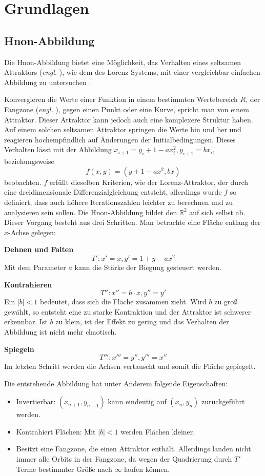 
\chapter{Grundlagen}
\label{ch:Grundlagen}
\section{H\e non-Abbildung}
Die H\e non-Abbildung bietet eine Möglichkeit, das Verhalten eines seltsamen Attraktors (\textit{engl. }), wie dem des Lorenz Systems, mit einer vergleichbar einfachen Abbildung zu untersuchen \cite{henon1976}.

Konvergieren die Werte einer Funktion in einem bestimmten Wertebereich $R$, der Fangzone (\textit{engl. }), gegen einen Punkt oder eine Kurve, spricht man von einem Attraktor. Dieser Attraktor kann jedoch auch eine komplexere Struktur haben. Auf einem solchen seltsamen Attraktor springen die Werte hin und her und reagieren hochempfindlich auf Änderungen der Initialbedingungen. Dieses Verhalten lässt mit der Abbildung $x_{i+1}=y_i + 1- a x_i^2, y_{i+1} = bx_i$, beziehungsweise 
$$f(x,y) = (y + 1- a x^2,bx)$$
beobachten. $f$ erfüllt dieselben Kriterien, wie der Lorenz-Attraktor, der durch eine dreidimensionale Differenzialgleichung entsteht, allerdings wurde $f$ so definiert, dass auch höhere Iterationszahlen leichter zu berechnen und zu analysieren sein sollen. Die H\e non-Abbildung bildet den $\mathbb{R}^2$ auf sich selbst ab. Dieser Vorgang besteht aus drei Schritten. Man betrachte eine Fläche entlang der $x$-Achse gelegen:

\textbf{Dehnen und Falten}
$$T': x'=x, y'= 1+ y - ax^2$$
Mit dem Parameter $a$ kann die Stärke der Biegung gesteuert werden.


\textbf{Kontrahieren}
$$T'': x''= b\cdot x, y''= y'$$
Ein $|b|<1$ bedeutet, dass sich die Fläche zusammen zieht. Wird $b$ zu groß gewählt, so entsteht eine zu starke Kontraktion und der Attraktor ist schwerer erkennbar. Ist $b$ zu klein, ist der Effekt zu gering und das Verhalten der Abbildung ist nicht mehr chaotisch.


\textbf{Spiegeln}
$$T''': x'''= y'', y'''= x''$$
Im letzten Schritt werden die Achsen vertauscht und somit die Fläche gepiegelt.


Die entstehende Abbildung hat unter Anderem folgende Eigenschaften:
\begin{itemize}
 \item Invertierbar: $(x_{n+1}, y_{n+1})$ kann eindeutig auf $(x_n, y_n)$ zurückgeführt werden.
 \item Kontrahiert Flächen: Mit $|b|<1$ werden Flächen kleiner.
 \item Besitzt eine Fangzone, die einen Attraktor enthält. Allerdings landen nicht immer alle Orbits in der Fangzone, da wegen der Quadrierung durch $T'$ Terme bestimmter Größe nach $\infty$ laufen können.
\end{itemize}


